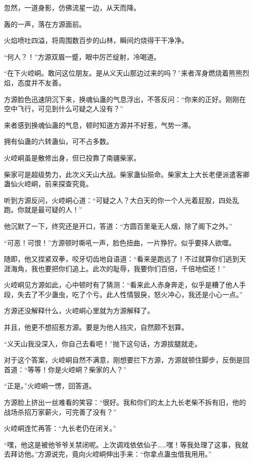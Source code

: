 \begin{this_body}
忽然，一道身影，仿佛流星一边，从天而降。

轰的一声，落在方源面前。

火焰喷吐四溢，将周围数百步的山林，瞬间灼烧得干干净净。

“何人？！”方源双眉一蹙，眼中厉芒绽射，冷喝道。

“在下火崆峒。敢问这位朋友。是从义天山那边过来的吗？”来者浑身燃烧着熊熊烈焰，态度并不友善。

方源脸色迅速阴沉下来，换魂仙蛊的气息浮出，不答反问：“你来的正好。刚刚在空中飞行，可见到什么可疑之人没有？”

来者感到换魂仙蛊的气息，顿时知道方源并不好惹，气势一滞。

拥有仙蛊的六转蛊仙，可不占多数。

火崆峒虽是散修出身，但已投靠了南疆柴家。

柴家可是超级势力，此次义天山大战。柴家蛊仙殒命。柴家太上大长老便派遣客卿蛊仙火崆峒，前来探查究竟。

听到方源反问，火崆峒心道：“可疑之人？大白天的你一个人光着屁股，四处乱跑。你就是最可疑的人！”

他沉默了一下，终究还是开口，答道：“方圆百里毫无人烟，除了阁下之外。”

“可恶！可恨！”方源顿时嘶吼一声，脸色扭曲，一片狰狞。似乎要择人欲噬。

随即，他又捏紧双拳，咬牙切齿地自语道：“看来是跑远了！不过就算你们逃到天涯海角，我也要把你们追上。此次的耻辱，我要你们百倍，千倍地偿还！”

火崆峒见方源如此，心中顿时有了猜测：“看来此人赤身奔走，似乎是糟了他人手段，失去了不少蛊虫，吃了个亏。此人性情狠戾，怒火冲心，我还是小心一点。”

方源还没解释什么，火崆峒心里就为方源解释了。

并且，他更不想招惹方源。要是为他人挡灾，自然颇不划算。

“义天山我没深入，你自己去看吧！”抛下这句话，方源拔腿就走。

对于这个答案，火崆峒自然不满意，刚想要拦下方源，方源就顿住脚步，反倒是回首道：“等等！你是火崆峒？柴家的人？”

“正是。”火崆峒一愣，回答道。

方源脸上挤出一丝难看的笑容：“很好。我和你们的太上九长老柴不拆有旧，他的战场杀招万家薪火，可完善了没有？”

火崆峒连忙再答：“九长老仍在闭关。”

“嘿，他这是被他爷爷关禁闭呢。上次调戏依依仙子……嘿！等我处理了这事，我就去拜访他。”方源说完，竟向火崆峒伸出手来：“你拿点蛊虫借我用用。”


\end{this_body}
